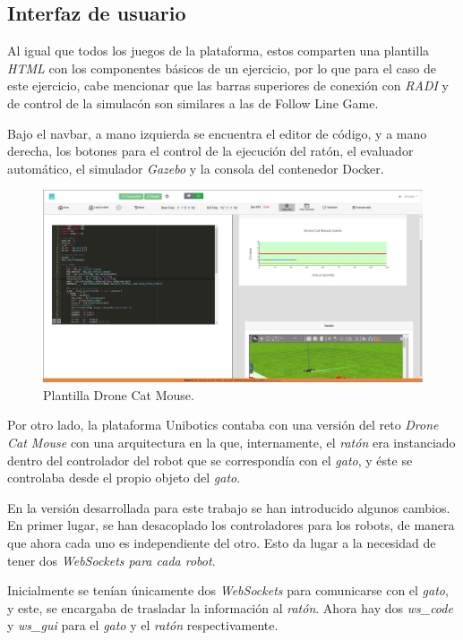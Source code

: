 \documentclass[a4paper, 12pt]{book}
\begin{document}
\subsection{Interfaz de usuario}
\label{drone_cat_mouse_interface}

Al igual que todos los juegos de la plataforma, estos comparten una plantilla \emph{HTML} con los componentes básicos de un ejercicio, por lo que para el caso de este ejercicio, cabe mencionar que las barras superiores de conexión con \emph{RADI} y de control de la simulacón son similares a las de Follow Line Game.

Bajo el navbar, a mano izquierda se encuentra el editor de código, y a mano derecha, los botones para el control de la ejecución del ratón, el evaluador automático, el simulador \emph{Gazebo} y la consola del contenedor Docker.


\begin{figure}[H]
	\centering
    \includegraphics[width=15cm]{img/drone_cat_mouse.png}
    \caption{Plantilla Drone Cat Mouse.}
    \label{figura:keyhandler}
\end{figure}

Por otro lado, la plataforma Unibotics contaba con una versión del reto \emph{Drone Cat Mouse} con una arquitectura en la que, internamente, el \emph{ratón} era instanciado dentro del controlador del robot que se correspondía con el \emph{gato}, y éste se controlaba desde el propio objeto del \emph{gato}.

En la versión desarrollada para este trabajo se han introducido algunos cambios. En primer lugar, se han desacoplado los controladores para los robots, de manera que ahora cada uno es independiente del otro. Esto da lugar a la necesidad de tener dos \emph{WebSockets para cada robot}. 

Inicialmente se tenían únicamente dos \emph{WebSockets} para comunicarse con el \emph{gato}, y este, se encargaba de trasladar la información al \emph{ratón}. Ahora hay dos \emph{ws\_code} y \emph{ws\_gui} para el \emph{gato} y el \emph{ratón} respectivamente.
\end{document}
